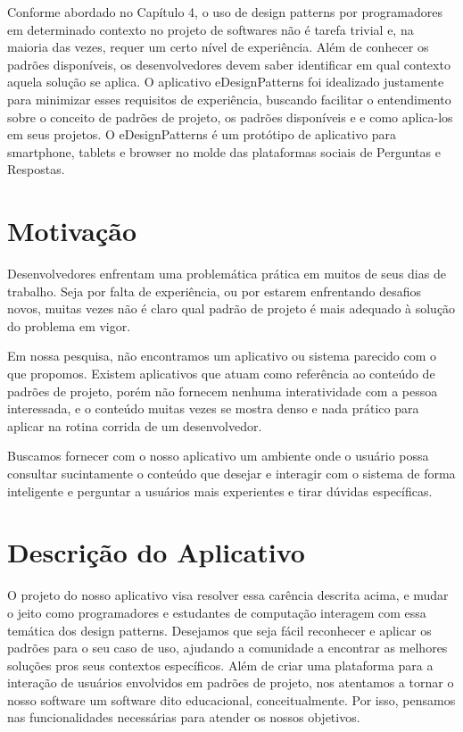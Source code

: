 Conforme abordado no Capítulo 4, o uso de design patterns por programadores em determinado contexto no projeto de softwares não é tarefa trivial e, na maioria das vezes, requer um certo nível de experiência. Além de conhecer os padrões disponíveis, os desenvolvedores devem saber identificar em qual contexto aquela solução se aplica. O aplicativo eDesignPatterns foi idealizado justamente para minimizar esses requisitos de experiência, buscando facilitar o entendimento sobre o conceito de padrões de projeto, os padrões disponíveis e e como aplica-los em seus projetos. O eDesignPatterns é um protótipo de aplicativo para smartphone, tablets e browser no molde das plataformas sociais de Perguntas e Respostas.

\section{ Motivação}
Desenvolvedores enfrentam uma problemática prática em muitos de seus dias de trabalho. Seja por falta de experiência, ou por estarem enfrentando desafios novos, muitas vezes não é claro qual padrão de projeto é mais adequado à solução do problema em vigor.

Em nossa pesquisa, não encontramos um aplicativo ou sistema parecido com o que propomos. Existem aplicativos que atuam como referência ao conteúdo de padrões de projeto, porém não fornecem nenhuma interatividade com a pessoa interessada, e o conteúdo muitas vezes se mostra denso e nada prático para aplicar na rotina corrida de um desenvolvedor.

Buscamos fornecer com o nosso aplicativo um ambiente onde o usuário possa consultar sucintamente o conteúdo que desejar e interagir com o sistema de forma inteligente e perguntar a usuários mais experientes e tirar dúvidas específicas.

\section{Descrição do Aplicativo}
O projeto do nosso aplicativo visa resolver essa carência descrita acima, e mudar o jeito como programadores e estudantes de computação interagem com essa temática dos design patterns. Desejamos que seja fácil reconhecer e aplicar os padrões para o seu caso de uso, ajudando a comunidade a encontrar as melhores soluções pros seus contextos específicos. Além de criar uma plataforma para a interação de usuários envolvidos em padrões de projeto, nos atentamos a tornar o nosso software um software dito educacional, conceitualmente. Por isso, pensamos nas funcionalidades necessárias para atender os nossos objetivos.


